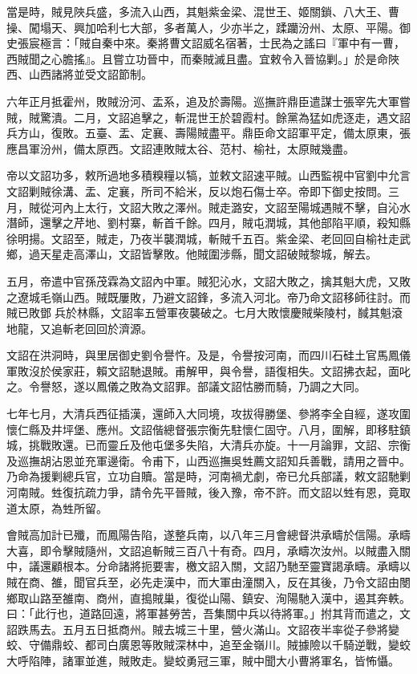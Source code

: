 \begin{pinyinscope}
當是時，賊見陜兵盛，多流入山西，其魁紫金梁、混世王、姬關鎖、八大王、曹操、闖塌天、興加哈利七大部，多者萬人，少亦半之，蹂躪汾州、太原、平陽。御史張宸極言：「賊自秦中來。秦將曹文詔威名宿著，士民為之謠曰『軍中有一曹，西賊聞之心膽搖』。且嘗立功晉中，而秦賊滅且盡。宜敕令入晉協剿。」於是命陜西、山西諸將並受文詔節制。

六年正月抵霍州，敗賊汾河、盂系，追及於壽陽。巡撫許鼎臣遣謀士張宰先大軍嘗賊，賊驚潰。二月，文詔追擊之，斬混世王於碧霞村。餘黨為猛如虎逐走，遇文詔兵方山，復敗。五臺、盂、定襄、壽陽賊盡平。鼎臣命文詔軍平定，備太原東，張應昌軍汾州，備太原西。文詔連敗賊太谷、范村、榆社，太原賊幾盡。

帝以文詔功多，敕所過地多積糗糧以犒，並敕文詔速平賊。山西監視中官劉中允言文詔剿賊徐溝、盂、定襄，所司不給米，反以炮石傷士卒。帝即下御史按問。三月，賊從河內上太行，文詔大敗之澤州。賊走潞安，文詔至陽城遇賊不擊，自沁水潛師，還擊之芹地、劉村寨，斬首千餘。四月，賊屯潤城，其他部陷平順，殺知縣徐明揚。文詔至，賊走，乃夜半襲潤城，斬賊千五百。紫金梁、老回回自榆社走武鄉，過天星走高澤山，文詔皆擊敗。他賊圍涉縣，聞文詔破賊黎城，解去。

五月，帝遣中官孫茂霖為文詔內中軍。賊犯沁水，文詔大敗之，擒其魁大虎，又敗之遼城毛嶺山西。賊既屢敗，乃避文詔鋒，多流入河北。帝乃命文詔移師往討。而賊已敗鄧兵於林縣，文詔率五營軍夜襲破之。七月大敗懷慶賊柴陵村，馘其魁滾地龍，又追斬老回回於濟源。

文詔在洪洞時，與里居御史劉令譽忤。及是，令譽按河南，而四川石硅土官馬鳳儀軍敗沒於侯家莊，賴文詔馳退賊。甫解甲，與令譽，語復相失。文詔拂衣起，面叱之。令譽怒，遂以鳳儀之敗為文詔罪。部議文詔怙勝而騎，乃調之大同。

七年七月，大清兵西征插漢，還師入大同境，攻拔得勝堡、參將李全自經，遂攻圍懷仁縣及井坪堡、應州。文詔偕總督張宗衡先駐懷仁固守。八月，圍解，即移駐鎮城，挑戰敗還。已而靈丘及他屯堡多失陷，大清兵亦旋。十一月論罪，文詔、宗衡及巡撫胡沾恩並充軍邊衛。令甫下，山西巡撫吳甡薦文詔知兵善戰，請用之晉中。乃命為援剿總兵官，立功自贖。當是時，河南禍尤劇，帝已允兵部議，敕文詔馳剿河南賊。甡復抗疏力爭，請令先平晉賊，後入豫，帝不許。而文詔以甡有恩，竟取道太原，為甡所留。

會賊高加計已殲，而鳳陽告陷，遂整兵南，以八年三月會總督洪承疇於信陽。承疇大喜，即令擊賊隨州，文詔追斬賊三百八十有奇。四月，承疇次汝州。以賊盡入關中，議還顧根本。分命諸將扼要害，檄文詔入關，文詔乃馳至靈寶謁承疇。承疇以賊在商、雒，聞官兵至，必先走漢中，而大軍由潼關入，反在其後，乃令文詔由閿鄉取山路至雒南、商州，直搗賊巢，復從山陽、鎮安、洵陽馳入漢中，遏其奔軼。曰：「此行也，道路回遠，將軍甚勞苦，吾集關中兵以待將軍。」拊其背而遣之，文詔跌馬去。五月五日抵商州。賊去城三十里，營火滿山。文詔夜半率從子參將變蛟、守備鼎蛟、都司白廣恩等敗賊深林中，追至金嶺川。賊據險以千騎逆戰，變蛟大呼陷陣，諸軍並進，賊敗走。變蛟勇冠三軍，賊中聞大小曹將軍名，皆怖懾。


\end{pinyinscope}
